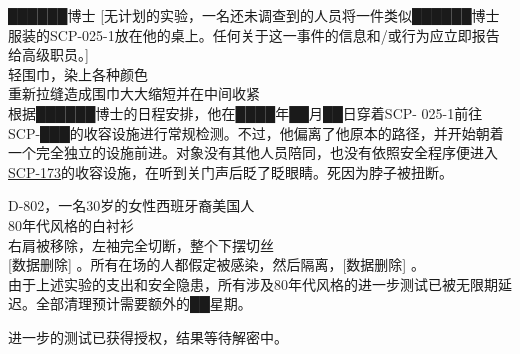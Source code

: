 \begin{scpbox}
██████博士 [无计划的实验，一名还未调查到的人员将一件类似██████博士服装的SCP-025-1放在他的桌上。任何关于这一事件的信息和\slash 或行为应立即报告给高级职员。]\\轻围巾，染上各种颜色\\重新拉缝造成围巾大大缩短并在中间收紧\\根据██████博士的日程安排，他在████年██月██日穿着SCP- 025-1前往SCP-███的收容设施进行常规检测。不过，他偏离了他原本的路径，并开始朝着一个完全独立的设施前进。对象没有其他人员陪同，也没有依照安全程序便进入\hyperref[chap:SCP-173]{SCP-173}的收容设施，在听到关门声后眨了眨眼睛。死因为脖子被扭断。

D-802，一名30岁的女性西班牙裔美国人\\80年代风格的白衬衫\\右肩被移除，左袖完全切断，整个下摆切丝\\ [数据删除] 。所有在场的人都假定被感染，然后隔离，[数据删除] 。\\
由于上述实验的支出和安全隐患，所有涉及80年代风格的进一步测试已被无限期延迟。全部清理预计需要额外的██星期。

\end{scpbox}

进一步的测试已获得授权，结果等待解密中。
